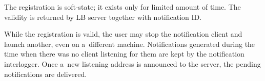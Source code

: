 The registration is soft-state; it exists only for limited amount of time. The
validity is returned by LB server together with notification ID.

While the registration is valid, 
the user may stop the notification client and launch another, even
on a~different machine.
Notifications generated during the time when there was no client listening
for them are kept by the notification interlogger.
Once a~new listening address is announced to the
server, the pending notifications are delivered. 

\endinput
